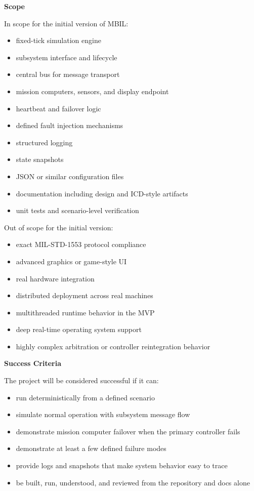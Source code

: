 \documentclass[12pt]{article}
\begin{document}
\textbf{Scope}

In scope for the initial version of MBIL:

\begin{itemize}[leftmargin=*]
    \item fixed-tick simulation engine
    \item subsystem interface and lifecycle
    \item central bus for message transport
    \item mission computers, sensors, and display endpoint
    \item heartbeat and failover logic
    \item defined fault injection mechanisms
    \item structured logging
    \item state snapshots
    \item JSON or similar configuration files
    \item documentation including design and ICD-style artifacts
    \item unit tests and scenario-level verification
\end{itemize}

Out of scope for the initial version:

\begin{itemize}[leftmargin=*]
    \item exact MIL-STD-1553 protocol compliance
    \item advanced graphics or game-style UI
    \item real hardware integration
    \item distributed deployment across real machines
    \item multithreaded runtime behavior in the MVP
    \item deep real-time operating system support
    \item highly complex arbitration or controller reintegration behavior
\end{itemize}

\textbf{Success Criteria}

The project will be considered successful if it can:

\begin{itemize}[leftmargin=*]
    \item run deterministically from a defined scenario
    \item simulate normal operation with subsystem message flow
    \item demonstrate mission computer failover when the primary controller fails
    \item demonstrate at least a few defined failure modes
    \item provide logs and snapshots that make system behavior easy to trace
    \item be built, run, understood, and reviewed from the repository and docs alone
\end{itemize}
\end{document}

